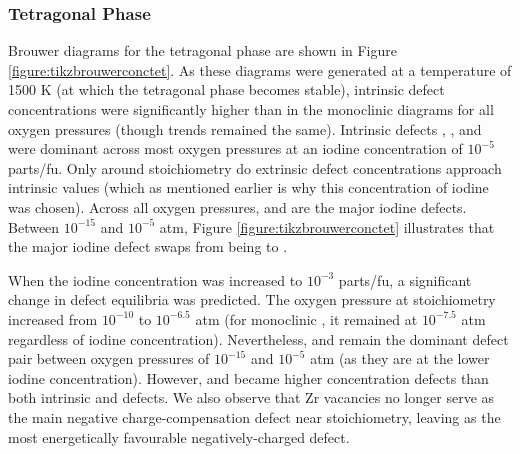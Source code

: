 
\subsubsection*{Tetragonal Phase}

Brouwer diagrams for the tetragonal phase are shown in Figure \ref{figure:tikzbrouwerconctet}. As these diagrams were generated at a temperature of 1500 K (at which the tetragonal phase becomes stable), intrinsic defect concentrations were significantly higher than in the monoclinic diagrams for all oxygen pressures (though trends remained the same). Intrinsic defects , ,  and  were dominant across most oxygen pressures at an iodine concentration of $10^{-5}$ parts/fu. Only around stoichiometry do extrinsic defect concentrations approach intrinsic values (which as mentioned earlier is why this concentration of iodine was chosen). Across all oxygen pressures,  and  are the major iodine defects. Between $10^{-15}$ and $10^{-5}$ atm, Figure \ref{figure:tikzbrouwerconctet} illustrates that the major iodine defect swaps from being  to . 

When the iodine concentration was increased to $10^{-3}$ parts/fu, a significant change in defect equilibria was predicted. The oxygen pressure at stoichiometry increased from $10^{-10}$ to $10^{-6.5}$ atm (for monoclinic \zirconia, it remained at $10^{-7.5}$ atm regardless of iodine concentration). Nevertheless,  and  remain the dominant defect pair between oxygen pressures of $10^{-15}$ and $10^{-5}$ atm (as they are at the lower iodine concentration). However,  and  became higher concentration defects than both intrinsic  and  defects. We also observe that Zr vacancies no longer serve as the main negative charge-compensation defect near stoichiometry, leaving  as the most energetically favourable negatively-charged defect.  

